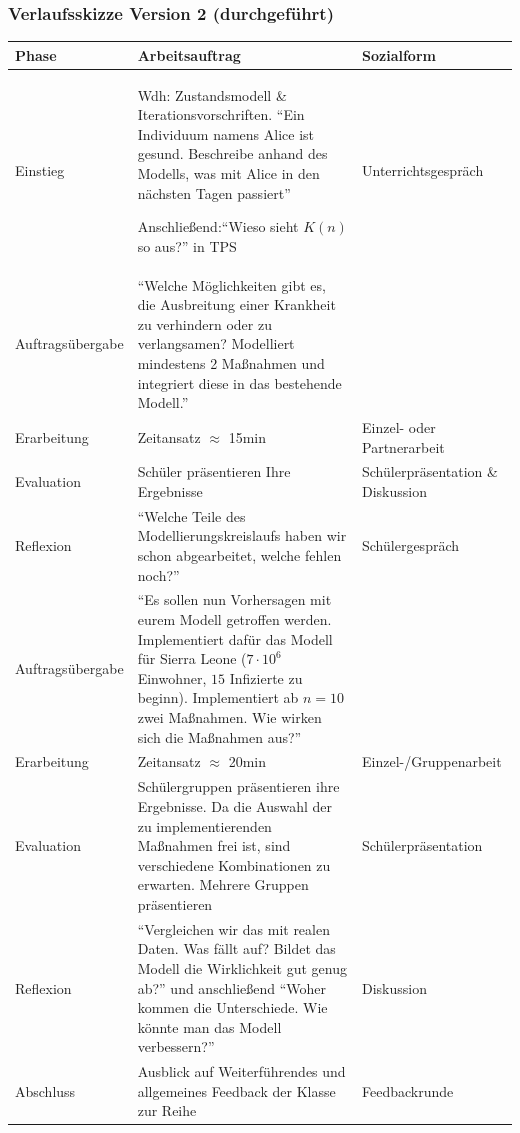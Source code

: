 \begin{landscape}
\subsubsection{Verlaufsskizze Version 2 (durchgeführt)}
\noindent
\begin{longtable}{|C{0.3\textwidth}|L{0.8\textwidth}|L{0.4\textwidth}|}
\hline
Phase & Arbeitsauftrag & Sozialform\\
\hline\hline
\endhead
Einstieg& Wdh: Zustandsmodell \& Iterationsvorschriften. ``Ein Individuum namens Alice ist gesund. Beschreibe anhand des Modells, was mit Alice in den nächsten Tagen passiert''

Anschließend:``Wieso sieht $K(n)$ so aus?'' in TPS& Unterrichtsgespräch\\\hline
Auftragsübergabe&``Welche Möglichkeiten gibt es, die Ausbreitung einer Krankheit zu verhindern oder zu verlangsamen? Modelliert mindestens 2 Maßnahmen und integriert diese in das bestehende Modell.''&\\\hline
Erarbeitung&Zeitansatz $\approx$ 15min&Einzel- oder Partnerarbeit\\\hline
Evaluation&Schüler präsentieren Ihre Ergebnisse&Schülerpräsentation \& Diskussion\\\hline
Reflexion&``Welche Teile des Modellierungskreislaufs haben wir schon abgearbeitet, welche fehlen noch?''&Schülergespräch\\\hline
Auftragsübergabe&``Es sollen nun Vorhersagen mit eurem Modell getroffen werden. Implementiert dafür das Modell für Sierra Leone ($7\cdot 10^6$ Einwohner, $15$ Infizierte zu beginn). Implementiert ab $n=10$ zwei Maßnahmen. Wie wirken sich die Maßnahmen aus?''&\\\hline
Erarbeitung&Zeitansatz $\approx$ 20min&Einzel-/Gruppenarbeit\\\hline
Evaluation&Schülergruppen präsentieren ihre Ergebnisse. Da die Auswahl der zu implementierenden Maßnahmen frei ist, sind verschiedene Kombinationen zu erwarten. Mehrere Gruppen präsentieren&Schülerpräsentation\\\hline
Reflexion&``Vergleichen wir das mit realen Daten. Was fällt auf? Bildet das Modell die Wirklichkeit gut genug ab?'' und anschließend ``Woher kommen die Unterschiede. Wie könnte man das Modell verbessern?''&Diskussion\\\hline
Abschluss&Ausblick auf Weiterführendes und allgemeines Feedback der Klasse zur Reihe&Feedbackrunde\\\hline
\end{longtable}
\end{landscape}

